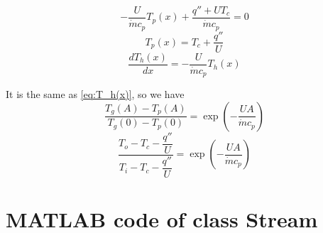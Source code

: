 \begin{equation}
-\frac{U}{\dot{m}c_{p}}T_{p}(x)+\frac{q''+UT_{c}}{\dot{m}c_{p}}=0
\end{equation}
\begin{equation}
T_{p}(x)=T_{c}+\frac{q''}{U}
\end{equation}
\begin{equation}
\frac{dT_{h}(x)}{dx}=-\frac{U}{\dot{m}c_{p}}T_{h}(x)
\end{equation}

It is the same as \autoref{eq:T_h(x)}, so we have
\begin{equation}
\frac{T_{g}(A)-T_{p}(A)}{T_{g}(0)-T_{p}(0)}=\exp(-\frac{UA}{\dot{m}c_{p}})
\end{equation}
\begin{equation}
\frac{T_{o}-T_{c}-\dfrac{q''}{U}}{T_{i}-T_{c}-\dfrac{q''}{U}}=\exp(-\frac{UA}{\dot{m}c_{p}})
\end{equation}

\chapter{MATLAB code of class Stream}
\label{cha:MATLAB_SOURCECODE}


